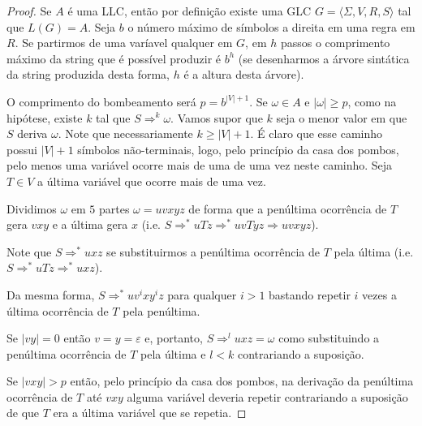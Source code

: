 \begin{proof}
  Se $A$ é uma LLC, então por definição existe uma GLC $G = \langle \Sigma, V, R, S \rangle$ tal que $L(G) = A$.
  Seja $b$ o número máximo de símbolos a direita em uma regra em $R$.
  Se partirmos de uma varíavel qualquer em $G$, em $h$ passos o comprimento máximo da string que é possível produzir é $b^h$ (se desenharmos a árvore sintática da string produzida desta forma, $h$ é a altura desta árvore).

  O comprimento do bombeamento será $p = b^{|V| + 1}$.
  Se $\omega \in A$ e $|\omega| \geq p$, como na hipótese, existe $k$ tal que $S \Rightarrow^k \omega$.
  Vamos supor que $k$ seja o menor valor em que $S$ deriva $\omega$.
  Note que necessariamente $k \geq |V| + 1$.
  É claro que esse caminho possui $|V|+1$ símbolos não-terminais, logo, pelo princípio da casa dos pombos, pelo menos uma variável ocorre mais de uma de uma vez neste caminho.
  Seja $T \in V$ a última variável que ocorre mais de uma vez.

  Dividimos $\omega$ em $5$ partes $\omega = uvxyz$ de forma que a penúltima ocorrência de $T$ gera $vxy$ e a última gera $x$ (i.e. $S \Rightarrow^* uTz \Rightarrow^* uvTyz \Rightarrow uvxyz$).


Note que $S \Rightarrow^* uxz$ se substituirmos a penúltima ocorrência de $T$ pela última (i.e. $S \Rightarrow^* uTz \Rightarrow^* uxz$).


Da mesma forma, $S \Rightarrow^* uv^ixy^iz$ para qualquer $i > 1$ bastando repetir $i$ vezes a última ocorrência de $T$ pela penúltima.


Se $|vy| = 0$ então $v = y = \varepsilon$ e, portanto, $S \Rightarrow^l uxz = \omega$ como substituindo a penúltima ocorrência de $T$ pela última e $l < k$ contrariando a suposição.

Se $|vxy| > p$ então, pelo princípio da casa dos pombos, na derivação da penúltima ocorrência de $T$ até $vxy$ alguma variável deveria repetir contrariando a suposição de que $T$ era a última variável que se repetia.
\end{proof}


